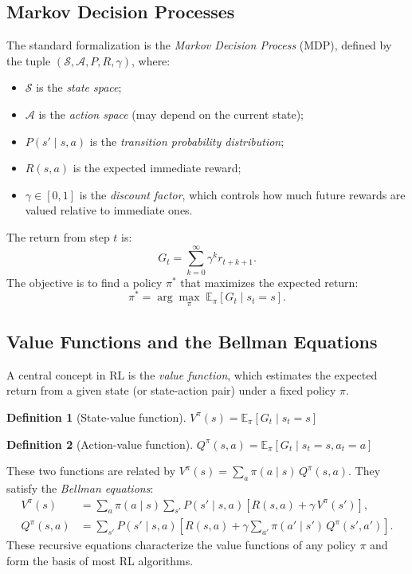 \documentclass[11pt,a4paper,twoside]{tesis}
\newtheorem{definition}{Definition}[chapter]
\begin{document}
\subsection{Markov Decision Processes}

The standard formalization is the \emph{Markov Decision Process} (MDP), defined by the
tuple $(\mathcal{S}, \mathcal{A}, P, R, \gamma)$, where:
\begin{itemize}
  \item $\mathcal{S}$ is the \emph{state space};
  \item $\mathcal{A}$ is the \emph{action space} (may depend on the current state);
  \item $P(s' \mid s, a)$ is the \emph{transition probability distribution};
  \item $R(s, a)$ is the expected immediate reward;
  \item $\gamma \in [0,1]$ is the \emph{discount factor}, which controls how much
    future rewards are valued relative to immediate ones.
\end{itemize}
The return from step $t$ is:
\[
G_t = \sum_{k=0}^{\infty} \gamma^k r_{t+k+1}.
\]
The objective is to find a policy $\pi^*$ that maximizes the expected return:
\[
\pi^* = \arg\max_{\pi} \; \mathbb{E}_{\pi}\left[G_t \mid s_t = s\right].
\]

\subsection{Value Functions and the Bellman Equations}

A central concept in RL is the \emph{value function}, which estimates the expected
return from a given state (or state-action pair) under a fixed policy $\pi$.

\begin{definition}[State-value function]
$V^\pi(s) = \mathbb{E}_\pi\left[G_t \mid s_t = s\right]$
\end{definition}

\begin{definition}[Action-value function]
$Q^\pi(s,a) = \mathbb{E}_\pi\left[G_t \mid s_t = s, a_t = a\right]$
\end{definition}

These two functions are related by $V^\pi(s) = \sum_a \pi(a \mid s)\, Q^\pi(s,a)$.
They satisfy the \emph{Bellman equations}:
\begin{align}
V^\pi(s) &= \sum_a \pi(a \mid s)\sum_{s'} P(s' \mid s,a)
            \left[R(s,a) + \gamma\, V^\pi(s')\right], \label{eq:bellman-v} \\
Q^\pi(s,a) &= \sum_{s'} P(s' \mid s,a)
             \left[R(s,a) + \gamma \sum_{a'}\pi(a' \mid s')\,Q^\pi(s',a')\right].
             \label{eq:bellman-q}
\end{align}
These recursive equations characterize the value functions of any policy $\pi$ and form
the basis of most RL algorithms.
\end{document}

